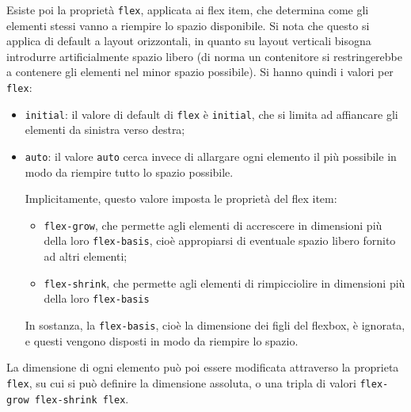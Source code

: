 \documentclass[a4paper,11pt]{article}
\begin{document}
Esiste poi la proprietà \lstinline|flex|, applicata ai flex item, che determina come gli elementi stessi vanno a riempire lo spazio disponibile.
Si nota che questo si applica di default a layout orizzontali, in quanto su layout verticali bisogna introdurre artificialmente spazio libero (di norma un contenitore si restringerebbe a contenere gli elementi nel minor spazio possibile).
Si hanno quindi i valori per \lstinline|flex|:
\begin{itemize}
	\item \lstinline|initial|: il valore di default di \lstinline|flex| è \lstinline|initial|, che si limita ad affiancare gli elementi da sinistra verso destra;
	\item \lstinline|auto|: il valore \lstinline|auto| cerca invece di allargare ogni elemento il più possibile in modo da riempire tutto lo spazio possibile.

Implicitamente, questo valore imposta le proprietà del flex item:
\begin{itemize}
	\item \lstinline|flex-grow|, che permette agli elementi di accrescere in dimensioni più della loro \lstinline|flex-basis|, cioè appropiarsi di eventuale spazio libero fornito ad altri elementi;
	\item \lstinline|flex-shrink|, che permette agli elementi di rimpicciolire in dimensioni più della loro \lstinline|flex-basis|
\end{itemize}
In sostanza, la \lstinline|flex-basis|, cioè la dimensione dei figli del flexbox, è ignorata, e questi vengono disposti in modo da riempire lo spazio.
\end{itemize}

La dimensione di ogni elemento può poi essere modificata attraverso la proprieta \lstinline|flex|, su cui si può definire la dimensione assoluta, o una tripla di valori \lstinline|flex-grow flex-shrink flex|.
\end{document}

